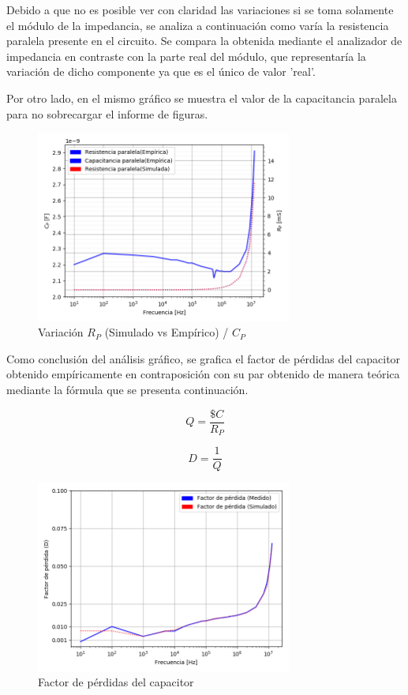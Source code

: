 Debido a que no es posible ver con claridad las variaciones si se toma solamente el módulo de la impedancia, se analiza a continuación como varía la resistencia paralela presente en el circuito. Se compara la obtenida mediante el analizador de impedancia en contraste con la parte real del módulo, que representaría la variación de dicho componente ya que es el único de valor 'real'.\par
Por otro lado, en el mismo gráfico se muestra el valor de la capacitancia paralela para no sobrecargar el informe de figuras.
\begin{figure}[H]
\centering
\includegraphics[width=0.75\textwidth]{Ejercicio_1(Germo)/Grafico/capacitor_relacion_C_P_y_R_p.png}
\caption{Variación $R_P$ (Simulado vs Empírico) / $C_P$ }
\label{fig:capacitor_relacion_C_P_y_R_p}
\end{figure}

Como conclusión del análisis gráfico, se grafica el factor de pérdidas del capacitor obtenido empíricamente en contraposición con su par obtenido de manera teórica mediante la fórmula que se presenta continuación.

\begin{equation}
Q= \frac{\$C}{R_P}
\end{equation}
\par
\begin{equation}
D= \frac{1}{Q}
\end{equation}

\begin{figure}[H]
\centering
\includegraphics[width=0.75\textwidth]{Ejercicio_1(Germo)/Grafico/capacitor_factor_de_perdida.png}
\caption{Factor de pérdidas del capacitor}
\label{fig:capacitor_factor_de_perdida}
\end{figure}

